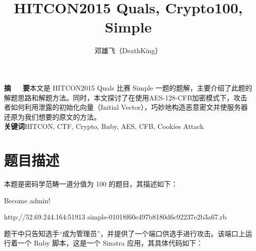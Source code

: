 \documentclass[a4paper,UTF8]{ctexart}
\title{HITCON2015 Quals, Crypto100, Simple}
\author{邓雄飞（DeathKing）}
\affil{哈尔滨工业大学，计算机科学与技术学院，dk@hit.edu.cn}
\date{}
\begin{document}
\maketitle

\begin{center}
\parbox{0.9\textwidth}{
\textbf{摘~~~要}\quad 本文是 HITCON2015 Quals 比赛 Simple 一题的题解，主要介绍了此题的解题思路和解题方法。同时，本文探讨了在使用AES-128-CFB加密模式下，攻击者如何利用泄露的初始化向量（Initial Vector），巧妙地构造恶意密文并使服务器还原为我们想要的原文的方法。\\
\textbf{关键词}\quad HITCON, CTF, Crypto, Ruby, AES, CFB, Cookies Attack\\}
\end{center}



\section{题目描述}

本题是密码学范畴一道分值为 100 的题目，其描述如下：\\

\begin{quizdesc}[label=Crypto100 Simple]
Become admin!

http://52.69.244.164:51913
simple-01018f60e497b8180d6c92237e2b3a67.rb
\end{quizdesc}

题干中只告知选手“成为管理员”，并提供了一个端口供选手进行攻击。该端口上运行着一个 Ruby 脚本，这是一个 Sinatra 应用，其具体代码如下：
\end{document}
